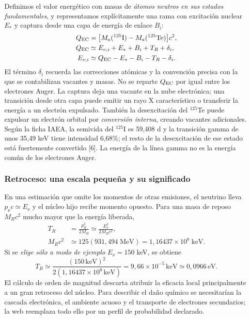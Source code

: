 Definimos el valor energético con masas de \emph{átomos neutros en sus estados
fundamentales}, y representamos explícitamente una rama con excitación nuclear
$E_*$ y captura desde una capa de energía de enlace $B_i$:
\begin{align}
Q_{\rm EC}&=\big[M_a({}^{125}\mathrm I)-M_a({}^{125}\mathrm{Te})\big]c^2,\\
Q_{\rm EC}&\simeq E_{\nu,i}+E_*+B_i+T_R+\delta_i,\\
E_{\nu,i}&\simeq Q_{\rm EC}-E_*-B_i-T_R-\delta_i.
\end{align}
El término $\delta_i$ recuerda las correcciones atómicas y la convención
precisa con la que se contabilizan vacantes y masas. No se reparte $Q_{\rm EC}$
por igual entre los electrones Auger. La captura deja una vacante en la nube
electrónica; una transición desde otra capa puede emitir un rayo X
característico o transferir la energía a un electrón expulsado. También la
desexcitación del $^{125}$Te puede expulsar un electrón orbital por
\emph{conversión interna}, creando vacantes adicionales. Según la ficha IAEA,
la semivida del $^{125}$I es 59,408 d y la transición gamma de unos 35,49 keV
tiene intensidad 6,68\%; el resto de la desexcitación de ese estado está
fuertemente convertido [6]. La energía de la línea gamma no es la energía
común de los electrones Auger.

\subsubsection{Retroceso: una escala pequeña y su significado}
En una estimación que omite los momentos de otras emisiones, el neutrino lleva
$p_\nu c\simeq E_\nu$ y el núcleo hijo recibe momento opuesto. Para una masa
de reposo $M_R c^2$ mucho mayor que la energía liberada,
\begin{align}
T_R&=\frac{p_R^2}{2M_R}\simeq\frac{E_\nu^2}{2M_Rc^2},\\
M_Rc^2&\simeq125(931{,}494\;\mathrm{MeV})
       =1{,}16437\times10^8\;\mathrm{keV}.
\end{align}
Si se \emph{elige sólo a modo de ejemplo} $E_\nu=150$ keV, se obtiene
\[
T_R\simeq\frac{(150\,\mathrm{keV})^2}
 {2(1{,}16437\times10^8\,\mathrm{keV})}
 =9{,}66\times10^{-5}\,\mathrm{keV}\simeq0{,}0966\,\mathrm{eV}.
\]
El cálculo de orden de magnitud descarta atribuir la eficacia local
principalmente a un gran retroceso del núcleo. Para describir el daño químico
se necesitarían la cascada electrónica, el ambiente acuoso y el transporte
de electrones secundarios; la web reemplaza todo ello por un perfil de
probabilidad declarado.

